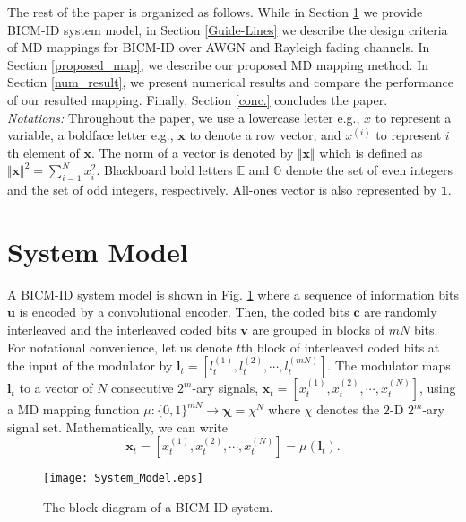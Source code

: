 \documentclass[12pt, draftclsnofoot, onecolumn]{IEEEtran}
\newcommand{\mb}[1]{\boldsymbol{#1}}
\begin{document}
The rest of the paper is organized as follows. While in Section \ref{sysmod} we provide BICM-ID system model, in Section \ref{Guide-Lines} we describe the design criteria of  MD mappings for BICM-ID  over AWGN and Rayleigh fading channels. In Section \ref{proposed_map}, we describe our  proposed MD mapping method.  In Section \ref{num_result}, we  present numerical results and
compare the  performance of our resulted  mapping.  Finally, Section \ref{conc.} concludes the paper. \\
\emph{Notations:} Throughout the paper, we use a lowercase letter e.g.,  $x$ to represent a variable, a boldface letter e.g.,  $\mb{x}$ to denote  a row vector,  and $x^{(i)}$ to represent  $i$th element of $\mb{x}$. The norm of a vector is denoted by $\Vert \mb{x}\Vert$ which is  defined  as $\Vert \mb{x} \Vert^{2} = \sum_{i=1}^{N} x_{i}^{2}$. Blackboard bold letters $\mathbb{E}$ and $\mathbb{O}$ denote the set of even integers and  the set of odd integers, respectively.   All-ones vector is also represented by $\mb{1}$. \color{black}
\color{black}
\section{System Model}
\label{sysmod}
 A BICM-ID  system model is shown in Fig. \ref{sys_mod} where 
 a sequence of information bits ${\mb u}$ is encoded by a convolutional encoder. Then, the coded bits ${\mb c}$ are  randomly interleaved and the interleaved coded bits ${\mb v}$ \color{black}are grouped in blocks of $mN$ bits. For notational convenience, let us denote $t$th block  of interleaved coded   bits at the input of the modulator by $\mb{l}_{t}=[l_{t}^{(1)}, l_{t}^{(2)},\cdots, l_{t}^{(mN)}]$. The modulator maps ${\mb l}_{t}$ to a vector of $N$ consecutive $2^{m}$-ary signals, ${\mb x}_{t} = [x_{t}^{(1)}, x_{t}^{(2)}, \cdots, x_{t}^{(N)}]$, using a MD mapping function $\mu : \lbrace0, 1\rbrace^{mN}\longrightarrow \mb{\chi} = \chi^{N}$ where $\chi$ denotes the $2$-D $2^{m}$-ary signal set.  Mathematically,  we can write 
\begin{equation}
{\mb x}_{t} = [x_{t}^{(1)}, x_{t}^{(2)}, \cdots, x_{t}^{(N)}] =\mu({\mb l}_{t}) .
\end{equation}

\begin{figure}[t]
\begin{center}
\texttt{[image: System\_Model.eps]} \caption{ The block diagram of a BICM-ID system.} 
\label{sys_mod}
\end{center}
\end{figure}
\end{document}
